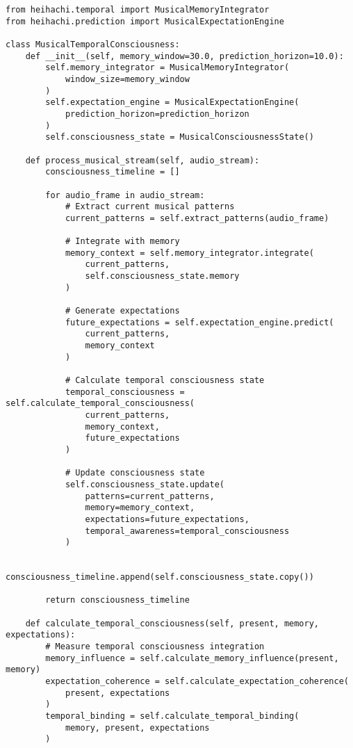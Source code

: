 \documentclass[12pt,a4paper]{article}
\begin{document}
\begin{lstlisting}[style=pythonstyle, caption=Musical Temporal Memory Processing]
from heihachi.temporal import MusicalMemoryIntegrator
from heihachi.prediction import MusicalExpectationEngine

class MusicalTemporalConsciousness:
    def __init__(self, memory_window=30.0, prediction_horizon=10.0):
        self.memory_integrator = MusicalMemoryIntegrator(
            window_size=memory_window
        )
        self.expectation_engine = MusicalExpectationEngine(
            prediction_horizon=prediction_horizon
        )
        self.consciousness_state = MusicalConsciousnessState()
        
    def process_musical_stream(self, audio_stream):
        consciousness_timeline = []
        
        for audio_frame in audio_stream:
            # Extract current musical patterns
            current_patterns = self.extract_patterns(audio_frame)
            
            # Integrate with memory
            memory_context = self.memory_integrator.integrate(
                current_patterns,
                self.consciousness_state.memory
            )
            
            # Generate expectations
            future_expectations = self.expectation_engine.predict(
                current_patterns,
                memory_context
            )
            
            # Calculate temporal consciousness state
            temporal_consciousness = self.calculate_temporal_consciousness(
                current_patterns,
                memory_context,
                future_expectations
            )
            
            # Update consciousness state
            self.consciousness_state.update(
                patterns=current_patterns,
                memory=memory_context,
                expectations=future_expectations,
                temporal_awareness=temporal_consciousness
            )
            
            consciousness_timeline.append(self.consciousness_state.copy())
        
        return consciousness_timeline
    
    def calculate_temporal_consciousness(self, present, memory, expectations):
        # Measure temporal consciousness integration
        memory_influence = self.calculate_memory_influence(present, memory)
        expectation_coherence = self.calculate_expectation_coherence(
            present, expectations
        )
        temporal_binding = self.calculate_temporal_binding(
            memory, present, expectations
        )
        

\end{lstlisting}
\end{document}
